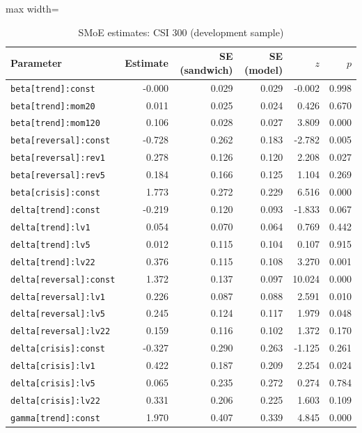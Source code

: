 \begin{table}[!htbp]\centering\scriptsize
\caption{SMoE estimates: CSI 300 (development sample)}\label{tab:params_csi300}
\begin{adjustbox}{max width=\textwidth}
\begin{tabular}{lrrrrr}
\toprule
Parameter & Estimate & SE (sandwich) & SE (model) & $z$ & $p$\\
\midrule
\texttt{beta[trend]:const} & -0.000 & 0.029 & 0.029 & -0.002 & 0.998\\
\texttt{beta[trend]:mom20} & 0.011 & 0.025 & 0.024 & 0.426 & 0.670\\
\texttt{beta[trend]:mom120} & 0.106 & 0.028 & 0.027 & 3.809 & 0.000\\
\texttt{beta[reversal]:const} & -0.728 & 0.262 & 0.183 & -2.782 & 0.005\\
\texttt{beta[reversal]:rev1} & 0.278 & 0.126 & 0.120 & 2.208 & 0.027\\
\texttt{beta[reversal]:rev5} & 0.184 & 0.166 & 0.125 & 1.104 & 0.269\\
\texttt{beta[crisis]:const} & 1.773 & 0.272 & 0.229 & 6.516 & 0.000\\
\texttt{delta[trend]:const} & -0.219 & 0.120 & 0.093 & -1.833 & 0.067\\
\texttt{delta[trend]:lv1} & 0.054 & 0.070 & 0.064 & 0.769 & 0.442\\
\texttt{delta[trend]:lv5} & 0.012 & 0.115 & 0.104 & 0.107 & 0.915\\
\texttt{delta[trend]:lv22} & 0.376 & 0.115 & 0.108 & 3.270 & 0.001\\
\texttt{delta[reversal]:const} & 1.372 & 0.137 & 0.097 & 10.024 & 0.000\\
\texttt{delta[reversal]:lv1} & 0.226 & 0.087 & 0.088 & 2.591 & 0.010\\
\texttt{delta[reversal]:lv5} & 0.245 & 0.124 & 0.117 & 1.979 & 0.048\\
\texttt{delta[reversal]:lv22} & 0.159 & 0.116 & 0.102 & 1.372 & 0.170\\
\texttt{delta[crisis]:const} & -0.327 & 0.290 & 0.263 & -1.125 & 0.261\\
\texttt{delta[crisis]:lv1} & 0.422 & 0.187 & 0.209 & 2.254 & 0.024\\
\texttt{delta[crisis]:lv5} & 0.065 & 0.235 & 0.272 & 0.274 & 0.784\\
\texttt{delta[crisis]:lv22} & 0.331 & 0.206 & 0.225 & 1.603 & 0.109\\
\texttt{gamma[trend]:const} & 1.970 & 0.407 & 0.339 & 4.845 & 0.000\\

\end{tabular}
\end{adjustbox}
\end{table}
